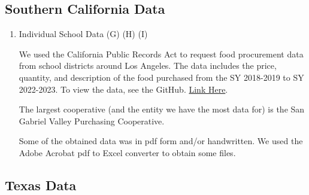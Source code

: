\documentclass[12pt]{article}
\begin{document}
\subsection{Southern California Data}

\begin{enumerate}
	\item Individual School Data (G) (H) (I)
	
	We used the California Public Records Act to request food procurement data from school districts around Los Angeles. The data includes the price, quantity, and description of the food purchased from the SY 2018-2019 to SY 2022-2023. To view the data, see the GitHub. \href{https://github.com/darionphan/obesitydata/tree/main}{Link Here}.
	
	The largest cooperative (and the entity we have the most data for) is the San Gabriel Valley Purchasing Cooperative. 
	
	Some of the obtained data was in pdf form and/or handwritten. We used the Adobe Acrobat pdf to Excel converter to obtain some files.
	
\end{enumerate}

\subsection{Texas Data}
\end{document}

